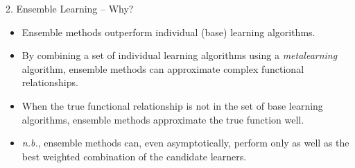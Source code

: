 \documentclass[12pt,t,handout]{beamer}
\begin{document}
\begin{frame}[c]{2. Ensemble Learning -- Why?}

\vspace*{3mm}

\centering

  \begin{itemize}
    \itemsep12pt
    \item Ensemble methods outperform individual (base) learning algorithms.
    \item By combining a set of individual learning algorithms using a
          \textit{metalearning} algorithm, ensemble methods can approximate
          complex functional relationships.
    \item When the true functional relationship is not in the set of base
          learning algorithms, ensemble methods approximate the true function
          well.
    \item \textit{n.b.}, ensemble methods can, even asymptotically, perform only
          as well as the best weighted combination of the candidate learners.
  \end{itemize}
\end{frame}
\end{document}
